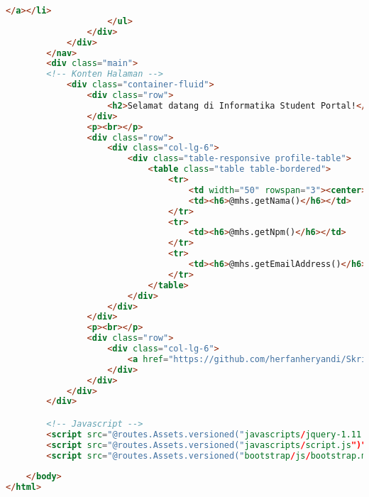 \begin{lstlisting}[language=html,basicstyle=\tiny,caption=home.scala.html]
						</a></li>
					</ul>
				</div>
			</div>
		</nav>
		<div class="main">
		<!-- Konten Halaman -->
			<div class="container-fluid">
				<div class="row">
					<h2>Selamat datang di Informatika Student Portal!</h2>
				</div>
				<p><br></p>
				<div class="row">
                    <div class="col-lg-6">
						<div class="table-responsive profile-table">
							<table class="table table-bordered">
								<tr>
									<td width="50" rowspan="3"><center><img src="@mhs.getPhotoPath()"/></center></td>
									<td><h6>@mhs.getNama()</h6></td>
								</tr>
								<tr>
									<td><h6>@mhs.getNpm()</h6></td>
								</tr>
								<tr>
									<td><h6>@mhs.getEmailAddress()</h6></td>
								</tr>
							</table>
						</div>
					</div>
				</div>
				<p><br></p>
				<div class="row">
					<div class="col-lg-6">
						<a href="https://github.com/herfanheryandi/Skripsi/tree/master/app/StudentPortal" target="_blank">Source code Informatika Student Portal</a>
					</div>
				</div>
			</div>
		</div>

		<!-- Javascript -->
		<script src="@routes.Assets.versioned("javascripts/jquery-1.11.3.min.js")"></script>
		<script src="@routes.Assets.versioned("javascripts/script.js")"></script>
		<script src="@routes.Assets.versioned("bootstrap/js/bootstrap.min.js")"></script>
		
    </body>
</html>
\end{lstlisting}



